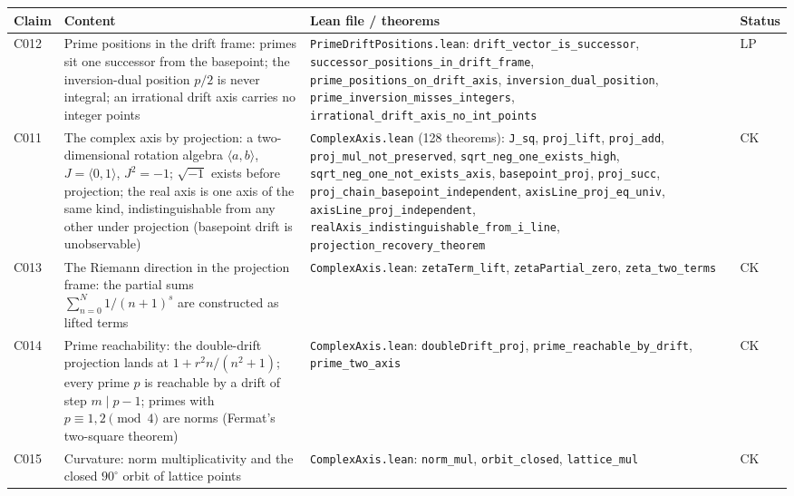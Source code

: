 \documentclass[sigplan,10pt,anonymous,review]{acmart}
\begin{document}
\begin{center}
\small
\begin{tabular}{@{}p{1.5cm}p{5.4cm}p{5.4cm}p{0.8cm}@{}}
\toprule
Claim & Content & Lean file / theorems & Status \\
\midrule
C012 & Prime positions in the drift frame: primes sit one successor from
the basepoint; the inversion-dual position $p/2$ is never integral; an
irrational drift axis carries no integer points &
\texttt{PrimeDriftPositions.lean}:
\texttt{drift\_vector\_is\_successor},
\texttt{successor\_positions\_in\_drift\_frame},
\texttt{prime\_positions\_on\_drift\_axis},
\texttt{inversion\_dual\_position},
\texttt{prime\_inversion\_misses\_integers},
\texttt{irrational\_drift\_axis\_no\_int\_points} &
\textcolor{proved}{LP} \\
C011 & The complex axis by projection: a two-dimensional rotation algebra
$\langle a,b\rangle$, $J = \langle 0,1\rangle$, $J^2 = -1$; $\sqrt{-1}$
exists before projection; the real axis is one axis of the same kind,
indistinguishable from any other under projection (basepoint drift is
unobservable) & \texttt{ComplexAxis.lean} (128 theorems):
\texttt{J\_sq}, \texttt{proj\_lift}, \texttt{proj\_add},
\texttt{proj\_mul\_not\_preserved}, \texttt{sqrt\_neg\_one\_exists\_high},
\texttt{sqrt\_neg\_one\_not\_exists\_axis},
\texttt{basepoint\_proj}, \texttt{proj\_succ},
\texttt{proj\_chain\_basepoint\_independent},
\texttt{axisLine\_proj\_eq\_univ}, \texttt{axisLine\_proj\_independent},
\texttt{realAxis\_indistinguishable\_from\_i\_line},
\texttt{projection\_recovery\_theorem} & \textcolor{classical}{CK} \\
C013 & The Riemann direction in the projection frame: the partial sums
$\sum_{n=0}^{N} 1/(n+1)^s$ are constructed as lifted terms &
\texttt{ComplexAxis.lean}: \texttt{zetaTerm\_lift},
\texttt{zetaPartial\_zero}, \texttt{zeta\_two\_terms} &
\textcolor{classical}{CK} \\
C014 & Prime reachability: the double-drift projection lands at
$1 + r^2 n/(n^2+1)$; every prime $p$ is reachable by a drift of step
$m \mid p-1$; primes with $p \equiv 1,2 \pmod 4$ are norms (Fermat's
two-square theorem) & \texttt{ComplexAxis.lean}:
\texttt{doubleDrift\_proj}, \texttt{prime\_reachable\_by\_drift},
\texttt{prime\_two\_axis} & \textcolor{classical}{CK} \\
C015 & Curvature: norm multiplicativity and the closed
$90^\circ$ orbit of lattice points & \texttt{ComplexAxis.lean}:
\texttt{norm\_mul}, \texttt{orbit\_closed}, \texttt{lattice\_mul} &
\textcolor{classical}{CK} \\

\end{tabular}
\end{center}
\end{document}

